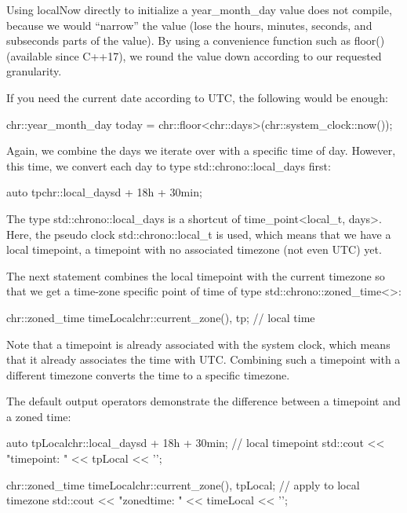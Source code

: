 Using localNow directly to initialize a year\_month\_day value does not compile, because we would “narrow” the value (lose the hours, minutes, seconds, and subseconds parts of the value). By using a convenience function such as floor() (available since C++17), we round the value down according to our requested granularity.

If you need the current date according to UTC, the following would be enough:

\begin{cpp}
chr::year_month_day today = chr::floor<chr::days>(chr::system_clock::now());
\end{cpp}


Again, we combine the days we iterate over with a specific time of day. However, this time, we convert each day to type std::chrono::local\_days first:

\begin{cpp}
auto tp{chr::local_days{d} + 18h + 30min};
\end{cpp}

The type std::chrono::local\_days is a shortcut of time\_point<local\_t, days>. Here, the pseudo clock std::chrono::local\_t is used, which means that we have a local timepoint, a timepoint with no associated timezone (not even UTC) yet.

The next statement combines the local timepoint with the current timezone so that we get a time-zone specific point of time of type std::chrono::zoned\_time<>:

\begin{cpp}
chr::zoned_time timeLocal{chr::current_zone(), tp}; // local time
\end{cpp}

Note that a timepoint is already associated with the system clock, which means that it already associates the time with UTC. Combining such a timepoint with a different timezone converts the time to a specific timezone.

The default output operators demonstrate the difference between a timepoint and a zoned time:

\begin{cpp}
auto tpLocal{chr::local_days{d} + 18h + 30min}; // local timepoint
std::cout << "timepoint: " << tpLocal << '\n';

chr::zoned_time timeLocal{chr::current_zone(), tpLocal}; // apply to local timezone
std::cout << "zonedtime: " << timeLocal << '\n';
\end{cpp}

